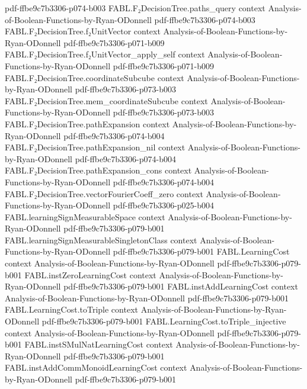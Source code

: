 \begin{theorem}
  {pdf-ffbe9c7b3306-p074-b003}
\proofstep
  {FABL.F₂DecisionTree.paths_query}
  {context}
  {Analysis-of-Boolean-Functions-by-Ryan-ODonnell}
  {pdf-ffbe9c7b3306-p074-b003}
\proofstep
  {FABL.F₂DecisionTree.f₂UnitVector}
  {context}
  {Analysis-of-Boolean-Functions-by-Ryan-ODonnell}
  {pdf-ffbe9c7b3306-p071-b009}
\proofstep
  {FABL.F₂DecisionTree.f₂UnitVector_apply_self}
  {context}
  {Analysis-of-Boolean-Functions-by-Ryan-ODonnell}
  {pdf-ffbe9c7b3306-p071-b009}
\proofstep
  {FABL.F₂DecisionTree.coordinateSubcube}
  {context}
  {Analysis-of-Boolean-Functions-by-Ryan-ODonnell}
  {pdf-ffbe9c7b3306-p073-b003}
\proofstep
  {FABL.F₂DecisionTree.mem_coordinateSubcube}
  {context}
  {Analysis-of-Boolean-Functions-by-Ryan-ODonnell}
  {pdf-ffbe9c7b3306-p073-b003}
\proofstep
  {FABL.F₂DecisionTree.pathExpansion}
  {context}
  {Analysis-of-Boolean-Functions-by-Ryan-ODonnell}
  {pdf-ffbe9c7b3306-p074-b004}
\proofstep
  {FABL.F₂DecisionTree.pathExpansion_nil}
  {context}
  {Analysis-of-Boolean-Functions-by-Ryan-ODonnell}
  {pdf-ffbe9c7b3306-p074-b004}
\proofstep
  {FABL.F₂DecisionTree.pathExpansion_cons}
  {context}
  {Analysis-of-Boolean-Functions-by-Ryan-ODonnell}
  {pdf-ffbe9c7b3306-p074-b004}
\proofstep
  {FABL.F₂DecisionTree.vectorFourierCoeff_zero}
  {context}
  {Analysis-of-Boolean-Functions-by-Ryan-ODonnell}
  {pdf-ffbe9c7b3306-p025-b004}
\proofstep
  {FABL.learningSignMeasurableSpace}
  {context}
  {Analysis-of-Boolean-Functions-by-Ryan-ODonnell}
  {pdf-ffbe9c7b3306-p079-b001}
\proofstep
  {FABL.learningSignMeasurableSingletonClass}
  {context}
  {Analysis-of-Boolean-Functions-by-Ryan-ODonnell}
  {pdf-ffbe9c7b3306-p079-b001}
\proofstep
  {FABL.LearningCost}
  {context}
  {Analysis-of-Boolean-Functions-by-Ryan-ODonnell}
  {pdf-ffbe9c7b3306-p079-b001}
\proofstep
  {FABL.instZeroLearningCost}
  {context}
  {Analysis-of-Boolean-Functions-by-Ryan-ODonnell}
  {pdf-ffbe9c7b3306-p079-b001}
\proofstep
  {FABL.instAddLearningCost}
  {context}
  {Analysis-of-Boolean-Functions-by-Ryan-ODonnell}
  {pdf-ffbe9c7b3306-p079-b001}
\proofstep
  {FABL.LearningCost.toTriple}
  {context}
  {Analysis-of-Boolean-Functions-by-Ryan-ODonnell}
  {pdf-ffbe9c7b3306-p079-b001}
\proofstep
  {FABL.LearningCost.toTriple_injective}
  {context}
  {Analysis-of-Boolean-Functions-by-Ryan-ODonnell}
  {pdf-ffbe9c7b3306-p079-b001}
\proofstep
  {FABL.instSMulNatLearningCost}
  {context}
  {Analysis-of-Boolean-Functions-by-Ryan-ODonnell}
  {pdf-ffbe9c7b3306-p079-b001}
\proofstep
  {FABL.instAddCommMonoidLearningCost}
  {context}
  {Analysis-of-Boolean-Functions-by-Ryan-ODonnell}
  {pdf-ffbe9c7b3306-p079-b001}

\end{theorem}
